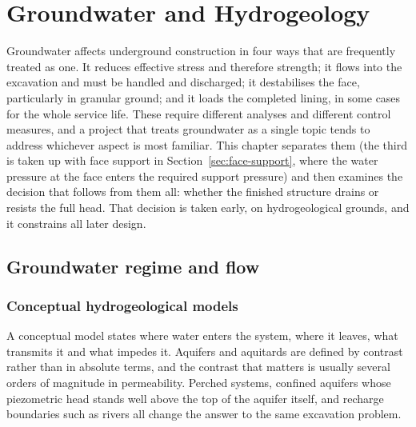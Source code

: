 \chapter{Groundwater and Hydrogeology}
\label{ch:hydrogeology}

Groundwater affects underground construction in four ways that are frequently
treated as one. It reduces effective stress and therefore strength; it flows
into the excavation and must be handled and discharged; it destabilises the
face, particularly in granular ground; and it loads the completed lining, in
some cases for the whole service life. These require different analyses and
different control measures, and a project that treats groundwater as a single
topic tends to address whichever aspect is most familiar. This chapter
separates them (the third is taken up with face support in
Section~\ref{sec:face-support}, where the water pressure at the face enters the
required support pressure) and then examines the decision that follows from them all:
whether the finished structure drains or resists the full head. That decision
is taken early, on hydrogeological grounds, and it constrains all later
design.

\section{Groundwater regime and flow}
\label{sec:groundwater-regime}

\subsection{Conceptual hydrogeological models}
\label{sec:hydrogeological-model}

A conceptual model states where water enters the system, where it leaves, what
transmits it and what impedes it. Aquifers and aquitards are defined by
contrast rather than in absolute terms, and the contrast that matters is
usually several orders of magnitude in permeability. Perched systems, confined
aquifers whose piezometric head stands well above the top of the aquifer
itself, and recharge boundaries such
as rivers all change the answer to the same excavation problem.

